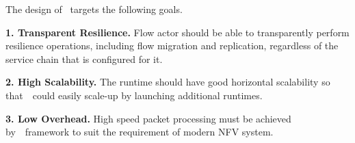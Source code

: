 

The design of \nfactor~targets the following goals. %

{\bf 1. Transparent Resilience.} Flow actor should be able to transparently perform resilience operations, including flow migration and replication, regardless of the service chain that is configured for it. %

{\bf 2. High Scalability.} The runtime should have good horizontal scalability so that~\nfactor~could easily scale-up by launching additional runtimes.

{\bf 3. Low Overhead.} High speed packet processing must be achieved by~\nfactor~framework to suit the requirement of modern NFV system.
